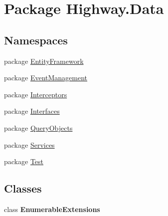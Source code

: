 \hypertarget{namespace_highway_1_1_data}{\section{Package Highway.\-Data}
\label{namespace_highway_1_1_data}
}
\subsection*{Namespaces}
\begin{DoxyCompactItemize}
\item 
package \hyperlink{namespace_highway_1_1_data_1_1_entity_framework}{Entity\-Framework}
\item 
package \hyperlink{namespace_highway_1_1_data_1_1_event_management}{Event\-Management}
\item 
package \hyperlink{namespace_highway_1_1_data_1_1_interceptors}{Interceptors}
\item 
package \hyperlink{namespace_highway_1_1_data_1_1_interfaces}{Interfaces}
\item 
package \hyperlink{namespace_highway_1_1_data_1_1_query_objects}{Query\-Objects}
\item 
package \hyperlink{namespace_highway_1_1_data_1_1_services}{Services}
\item 
package \hyperlink{namespace_highway_1_1_data_1_1_test}{Test}
\end{DoxyCompactItemize}
\subsection*{Classes}
\begin{DoxyCompactItemize}
\item 
class {\bfseries Enumerable\-Extensions}
\end{DoxyCompactItemize}

